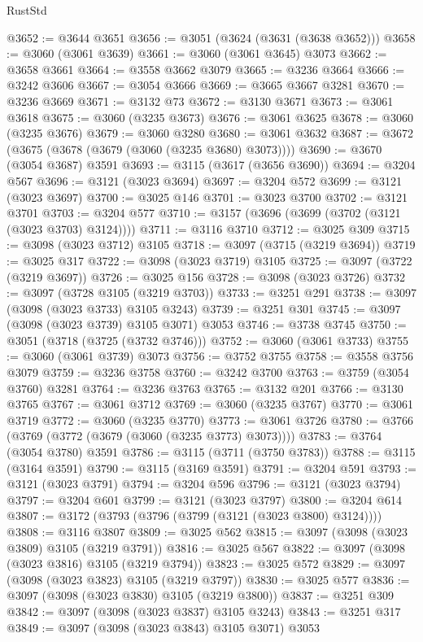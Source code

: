 \begin{lexlean}{RustStd}
\begin{coremodule}
@3652 := @3644 @3651
@3656 := @3051 (@3624 (@3631 (@3638 @3652)))
@3658 := @3060 (@3061 @3639)
@3661 := @3060 (@3061 @3645) @3073
@3662 := @3658 @3661
@3664 := @3558 @3662 @3079
@3665 := @3236 @3664
@3666 := @3242 @3606
@3667 := @3054 @3666
@3669 := @3665 @3667 @3281
@3670 := @3236 @3669
@3671 := @3132 @73
@3672 := @3130 @3671
@3673 := @3061 @3618
@3675 := @3060 (@3235 @3673)
@3676 := @3061 @3625
@3678 := @3060 (@3235 @3676)
@3679 := @3060 @3280
@3680 := @3061 @3632
@3687 := @3672 (@3675 (@3678 (@3679 (@3060 (@3235 @3680) @3073))))
@3690 := @3670 (@3054 @3687) @3591
@3693 := @3115 (@3617 (@3656 @3690))
@3694 := @3204 @567
@3696 := @3121 (@3023 @3694)
@3697 := @3204 @572
@3699 := @3121 (@3023 @3697)
@3700 := @3025 @146
@3701 := @3023 @3700
@3702 := @3121 @3701
@3703 := @3204 @577
@3710 := @3157 (@3696 (@3699 (@3702 (@3121 (@3023 @3703) @3124))))
@3711 := @3116 @3710
@3712 := @3025 @309
@3715 := @3098 (@3023 @3712) @3105
@3718 := @3097 (@3715 (@3219 @3694))
@3719 := @3025 @317
@3722 := @3098 (@3023 @3719) @3105
@3725 := @3097 (@3722 (@3219 @3697))
@3726 := @3025 @156
@3728 := @3098 (@3023 @3726)
@3732 := @3097 (@3728 @3105 (@3219 @3703))
@3733 := @3251 @291
@3738 := @3097 (@3098 (@3023 @3733) @3105 @3243)
@3739 := @3251 @301
@3745 := @3097 (@3098 (@3023 @3739) @3105 @3071) @3053
@3746 := @3738 @3745
@3750 := @3051 (@3718 (@3725 (@3732 @3746)))
@3752 := @3060 (@3061 @3733)
@3755 := @3060 (@3061 @3739) @3073
@3756 := @3752 @3755
@3758 := @3558 @3756 @3079
@3759 := @3236 @3758
@3760 := @3242 @3700
@3763 := @3759 (@3054 @3760) @3281
@3764 := @3236 @3763
@3765 := @3132 @201
@3766 := @3130 @3765
@3767 := @3061 @3712
@3769 := @3060 (@3235 @3767)
@3770 := @3061 @3719
@3772 := @3060 (@3235 @3770)
@3773 := @3061 @3726
@3780 := @3766 (@3769 (@3772 (@3679 (@3060 (@3235 @3773) @3073))))
@3783 := @3764 (@3054 @3780) @3591
@3786 := @3115 (@3711 (@3750 @3783))
@3788 := @3115 (@3164 @3591)
@3790 := @3115 (@3169 @3591)
@3791 := @3204 @591
@3793 := @3121 (@3023 @3791)
@3794 := @3204 @596
@3796 := @3121 (@3023 @3794)
@3797 := @3204 @601
@3799 := @3121 (@3023 @3797)
@3800 := @3204 @614
@3807 := @3172 (@3793 (@3796 (@3799 (@3121 (@3023 @3800) @3124))))
@3808 := @3116 @3807
@3809 := @3025 @562
@3815 := @3097 (@3098 (@3023 @3809) @3105 (@3219 @3791))
@3816 := @3025 @567
@3822 := @3097 (@3098 (@3023 @3816) @3105 (@3219 @3794))
@3823 := @3025 @572
@3829 := @3097 (@3098 (@3023 @3823) @3105 (@3219 @3797))
@3830 := @3025 @577
@3836 := @3097 (@3098 (@3023 @3830) @3105 (@3219 @3800))
@3837 := @3251 @309
@3842 := @3097 (@3098 (@3023 @3837) @3105 @3243)
@3843 := @3251 @317
@3849 := @3097 (@3098 (@3023 @3843) @3105 @3071) @3053

\end{coremodule}
\end{lexlean}
